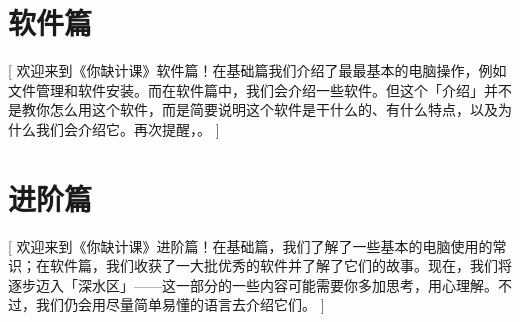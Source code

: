 \documentclass[a4paper]{book}
\begin{document}
\part{软件篇}[
  欢迎来到《你缺计课》软件篇！在基础篇我们介绍了最最基本的电脑操作，例如文件管理和软件安装。而在软件篇中，我们会介绍一些软件。但这个「介绍」并不是教你怎么用这个软件，而是简要说明这个软件是干什么的、有什么特点，以及为什么我们会介绍它。再次提醒，。
]








\part{进阶篇}[
  欢迎来到《你缺计课》进阶篇！在基础篇，我们了解了一些基本的电脑使用的常识；在软件篇，我们收获了一大批优秀的软件并了解了它们的故事。现在，我们将逐步迈入「深水区」——这一部分的一些内容可能需要你多加思考，用心理解。不过，我们仍会用尽量简单易懂的语言去介绍它们。
]









% 
% 

% 
\end{document}
